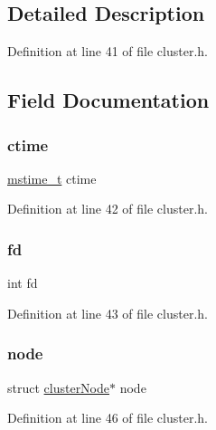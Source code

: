 \subsection{Detailed Description}


Definition at line 41 of file cluster.\+h.



\subsection{Field Documentation}
\mbox{\label{structcluster_link_a7e18258d5320891f16483de560a5a551}} 
\subsubsection{\texorpdfstring{ctime}{ctime}}
{\footnotesize\ttfamily \hyperlink{redismodule_8h_a652ae61e2475bc8957454534544968fc}{mstime\+\_\+t} ctime}



Definition at line 42 of file cluster.\+h.

\mbox{\label{structcluster_link_a6f8059414f0228f0256115e024eeed4b}} 
\subsubsection{\texorpdfstring{fd}{fd}}
{\footnotesize\ttfamily int fd}



Definition at line 43 of file cluster.\+h.

\mbox{\label{structcluster_link_a7aa2bc440db9dc659120a310878cac0f}} 
\subsubsection{\texorpdfstring{node}{node}}
{\footnotesize\ttfamily struct \hyperlink{structcluster_node}{cluster\+Node}$\ast$ node}



Definition at line 46 of file cluster.\+h.

\mbox{\label{structcluster_link_a3d5d75102832a2536981164afad5f218}} 
